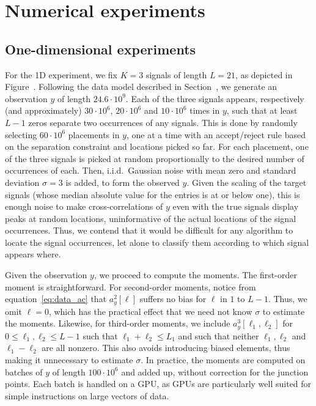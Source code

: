 \documentclass[english,11pt]{article}
\newcommand{\TODO}[1]{{\color{red}{[#1]}}}
\numberwithin{equation}{section}
\theoremstyle{plain}
\theoremstyle{definition}
\theoremstyle{remark}
\theoremstyle{plain}
\theoremstyle{remark}
\theoremstyle{plain}
\theoremstyle{plain}
\begin{document}
\section{Numerical experiments}   \label{sec:numerics}



\subsection{One-dimensional experiments}


For the 1D experiment, we fix $K = 3$ signals of length $L = 21$, as depicted in Figure~\TODO{ref}. Following the data model described in Section~\TODO{ref}, we generate an observation $y$ of length $24.6 \cdot 10^9$. Each of the three signals appears, respectively (and approximately) $30 \cdot 10^6$, $20 \cdot 10^6$ and $10 \cdot 10^6$ times in $y$, such that at least $L-1$ zeros separate two occurrences of any signals. This is done by randomly selecting $60 \cdot 10^6$ placements in $y$, one at a time with an accept/reject rule based on the separation constraint and locations picked so far. For each placement, one of the three signals is picked at random proportionally to the desired number of occurrences of each. Then, i.i.d.\ Gaussian noise with mean zero and standard deviation $\sigma = 3$ is added, to form the observed $y$. Given the scaling of the target signals (whose median absolute value for the entries is at or below one), this is enough noise to make cross-correlations of $y$ even with the true signals display peaks at random locations, uninformative of the actual locations of the signal occurrences. Thus, we contend that it would be difficult for any algorithm to locate the signal occurrences, let alone to classify them according to which signal appears where.

Given the observation $y$, we proceed to compute the moments. The first-order moment is straightforward. For second-order moments, notice from equation~\eqref{eq:data_ac} that $a_y^2[\ell]$ suffers no bias for $\ell$ in $1$ to $L-1$. Thus, we omit $\ell = 0$, which has the practical effect that we need not know $\sigma$ to estimate the moments. Likewise, for third-order moments, we include $a_y^3[\ell_1, \ell_2]$ for $0 \leq \ell_1, \ell_2 \leq L-1$ such that $\ell_1 + \ell_2 \leq L_1$ and such that neither $\ell_1, \ell_2$ and $\ell_1 - \ell_2$ are all nonzero. This also avoids introducing biased elements, thus making it unnecessary to estimate $\sigma$. In practice, the moments are computed on batches of $y$ of length $100\cdot10^6$ and added up, without correction for the junction points. Each batch is handled on a GPU, as GPUs are particularly well suited for simple instructions on large vectors of data.
\end{document}
